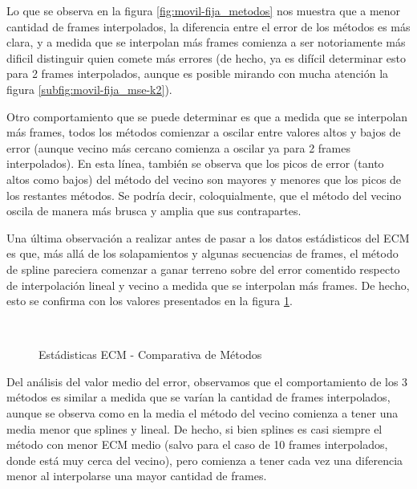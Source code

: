 \par Lo que se observa en la figura \ref{fig:movil-fija_metodos} nos muestra que
a menor cantidad de frames interpolados, la diferencia entre el error de los
m\'etodos es m\'as clara, y a medida que se interpolan m\'as frames comienza
a ser notoriamente m\'as dificil distinguir quien comete m\'as errores (de hecho,
ya es dif\'icil determinar esto para 2 frames interpolados, aunque es posible
mirando con mucha atenci\'on la figura \ref{subfig:movil-fija_mse-k2}).

\par Otro comportamiento que se puede determinar es que a medida que se
interpolan m\'as frames, todos los m\'etodos comienzar a oscilar entre valores
altos y bajos de error (aunque vecino m\'as cercano comienza a oscilar ya para
2 frames interpolados). En esta l\'inea, tambi\'en se observa que los picos de
error (tanto altos como bajos) del m\'etodo del vecino son mayores y menores
que los picos de los restantes m\'etodos. Se podr\'ia decir, coloquialmente,
que el m\'etodo del vecino oscila de manera m\'as brusca y amplia que sus
contrapartes.

\par Una \'ultima observaci\'on a realizar antes de pasar a los datos
est\'adisticos del ECM es que, m\'as all\'a de los solapamientos y algunas
secuencias de frames, el m\'etodo de spline pareciera comenzar a ganar terreno
sobre del error comentido respecto de interpolaci\'on lineal y vecino a medida
que se interpolan m\'as frames. De hecho, esto se confirma con los valores
presentados en la figura \ref{fig:movil-fija_methods-mse_estadisticas}.

\begin{figure}[H]
    \centering
    \\
    \caption{Est\'adisticas ECM - Comparativa de M\'etodos}
    \label{fig:movil-fija_methods-mse_estadisticas}
\end{figure}

\par Del an\'alisis del valor medio del error, observamos que el comportamiento
de los 3 m\'etodos es similar a medida que se var\'ian la cantidad de frames
interpolados, aunque se observa como en la media el m\'etodo del vecino comienza
a tener una media menor que splines y lineal. De hecho, si bien splines es
casi siempre el m\'etodo con menor ECM medio (salvo para el caso de 10 frames
interpolados, donde est\'a muy cerca del vecino), pero comienza a tener cada
vez una diferencia menor al interpolarse una mayor cantidad de frames.


